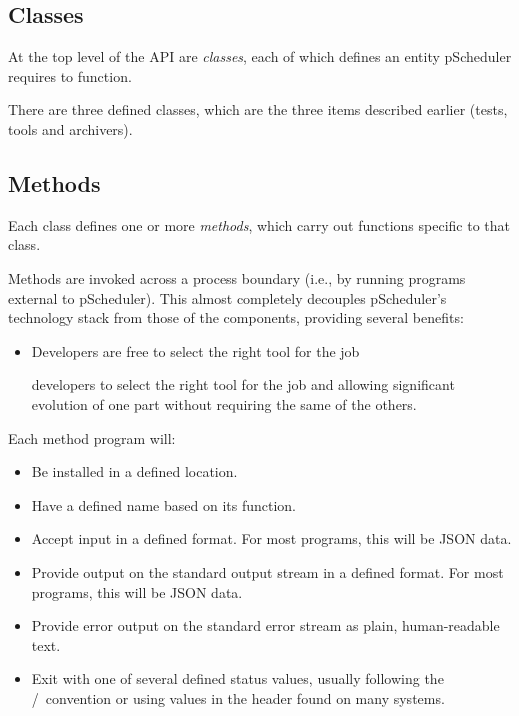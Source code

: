 \documentclass[10pt,titlepage]{article}
\begin{document}
\subsection{Classes}

At the top level of the API are {\it classes}, each of which defines
an entity pScheduler requires to function.

There are three defined classes, which are the three items described
earlier (tests, tools and archivers).

\subsection{Methods}

Each class defines one or more {\it methods}, which carry out
functions specific to that class.

Methods are invoked across a process boundary (i.e., by running
programs external to pScheduler).  This almost completely decouples
pScheduler's technology stack from those of the components, providing
several benefits:

\begin{itemize}
\item Developers are free to select the right tool for the job 

developers to select the right tool for the job and allowing
significant evolution of one part without requiring the same of the
others.
\end{itemize}

Each method program will:

\begin{itemize}
\item Be installed in a defined location.
\item Have a defined name based on its function.
\item Accept input in a defined format.  For most programs, this will
  be JSON data.
\item Provide output on the standard output stream in a defined
  format.  For most programs, this will be JSON data.
\item Provide error output on the standard error stream as plain,
  human-readable text.
\item Exit with one of several defined status values, usually
  following the \true/\false\ convention or using values in
  the  header found on many systems.
\end{itemize}
\end{document}
